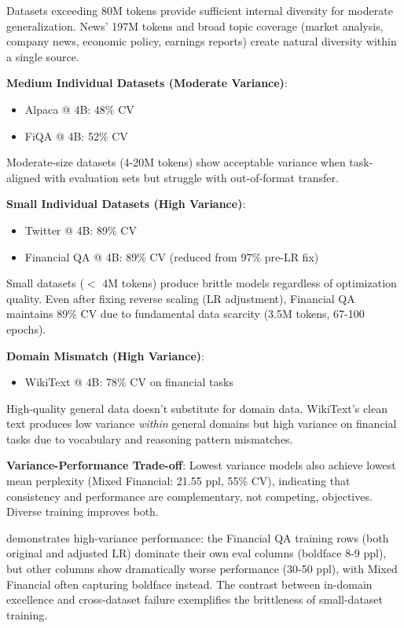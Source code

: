 Datasets exceeding 80M tokens provide sufficient internal diversity for moderate generalization. News' 197M tokens and broad topic coverage (market analysis, company news, economic policy, earnings reports) create natural diversity within a single source.

\textbf{Medium Individual Datasets (Moderate Variance)}:
\begin{itemize}
\item Alpaca @ 4B: 48\% CV
\item FiQA @ 4B: 52\% CV
\end{itemize}

Moderate-size datasets (4-20M tokens) show acceptable variance when task-aligned with evaluation sets but struggle with out-of-format transfer.

\textbf{Small Individual Datasets (High Variance)}:
\begin{itemize}
\item Twitter @ 4B: 89\% CV
\item Financial QA @ 4B: 89\% CV (reduced from 97\% pre-LR fix)
\end{itemize}

Small datasets ($<$ 4M tokens) produce brittle models regardless of optimization quality. Even after fixing reverse scaling (LR adjustment), Financial QA maintains 89\% CV due to fundamental data scarcity (3.5M tokens, 67-100 epochs).

\textbf{Domain Mismatch (High Variance)}:
\begin{itemize}
\item WikiText @ 4B: 78\% CV on financial tasks
\end{itemize}

High-quality general data doesn't substitute for domain data. WikiText's clean text produces low variance \textit{within} general domains but high variance on financial tasks due to vocabulary and reasoning pattern mismatches.

\textbf{Variance-Performance Trade-off}: Lowest variance models also achieve lowest mean perplexity (Mixed Financial: 21.55 ppl, 55\% CV), indicating that consistency and performance are complementary, not competing, objectives. Diverse training improves both.



 demonstrates high-variance performance: the Financial QA training rows (both original and adjusted LR) dominate their own eval columns (boldface 8-9 ppl), but other columns show dramatically worse performance (30-50 ppl), with Mixed Financial often capturing boldface instead. The contrast between in-domain excellence and cross-dataset failure exemplifies the brittleness of small-dataset training.

